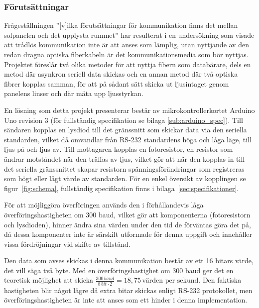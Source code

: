         \subsubsection{Förutsättningar} %
        \label{sub:forutsattningar}
                
            Frågeställningen ''[v]ilka förutsättningar för kommunikation finns det mellan solpanelen och det upplysta rummet'' har resulterat i en undersökning som visade att trådlös kommunikation inte är att anses som lämplig, utan nyttjande av den redan dragna optiska fiberkabeln är det kommunikationsmedia som bör nyttjas. Projektet föreslår två olika metoder för att nyttja fibern som databärare, dels en metod där asynkron seriell data skickas och en annan metod där två optiska fibrer kopplas samman, för att på sådant sätt skicka ut ljusintaget genom panelens linser och där mäta upp ljusstyrkan.\bigskip

            En lösning som detta projekt presenterar består av mikrokontrollerkortet Arduino Uno revision 3 (för fullständig specifikation se bilaga \ref{sub:arduino_spec})\cite{ardu}. Till sändaren kopplas en lysdiod till det gränssnitt som skickar data via den seriella standarden, vilket då omvandlar från RS-232 standardens höga och låga läge, till ljus på och ljus av. Till mottagaren kopplas en fotoresistor, en resistor som ändrar motståndet när den träffas av ljus, vilket gör att när den kopplas in till det seriella gränssnittet skapar resistorn spänningsförändringar som registreras som högt eller lågt värde av standarden. För en enkel översikt av kopplingen se figur~\ref{fig:schema}, fullständig specifikation finns i bilaga~\ref{sec:specifikationer}.\bigskip

            För att möjliggöra överföringen används den i förhållandevis låga överföringshastigheten om 300 baud, vilket gör att komponenterna (fotoresistorn och lysdioden), hinner ändra sina värden under den tid de förväntas göra det på, då dessa komponenter inte är särskilt utformade för denna uppgift och innehåller vissa fördröjningar vid skifte av tillstånd. \bigskip

            Den data som avses skickas i denna kommunikation består av ett 16 bitars värde, det vill säga två byte. Med en överföringshastighet om 300 baud ger det en teoretisk möjlighet att skicka $\frac{300 \,\textit{baud}}{8 \, bit \cdot 2} = 18,75 \, \text{värden per sekund}$. Den faktiska hastigheten blir något lägre då extra bitar skickas enligt RS-232 protokollet, men överföringshastigheten är inte att anses som ett hinder i denna implementation. \bigskip
            

